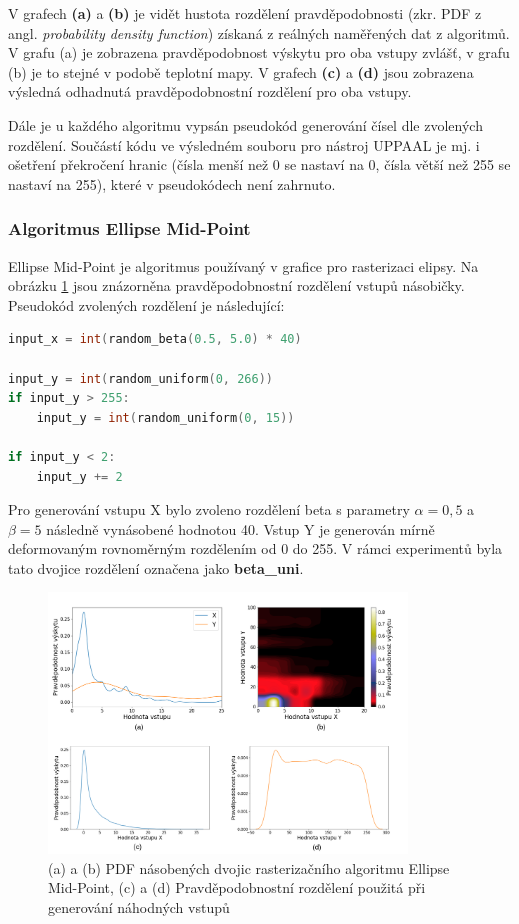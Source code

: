 V grafech \textbf{(a)} a \textbf{(b)} je vidět hustota rozdělení pravděpodobnosti (zkr. PDF z angl. \textit{probability density function}) získaná z reálných naměřených dat z algoritmů. V grafu (a) je zobrazena pravděpodobnost výskytu pro oba vstupy zvlášť, v grafu (b) je to stejné v podobě teplotní mapy. V grafech \textbf{(c)} a \textbf{(d)} jsou zobrazena výsledná odhadnutá pravděpodobnostní rozdělení pro oba vstupy.

Dále je u každého algoritmu vypsán pseudokód generování čísel dle zvolených rozdělení. Součástí kódu ve výsledném souboru pro nástroj UPPAAL je mj. i ošetření překročení hranic (čísla menší než 0 se nastaví na 0, čísla větší než 255 se nastaví na 255), které v pseudokódech není zahrnuto.

\pagebreak

\subsubsection{Algoritmus Ellipse Mid-Point}
Ellipse Mid-Point je algoritmus používaný v grafice pro rasterizaci elipsy. Na obrázku \ref{fig:beta_uni} jsou znázorněna pravděpodobnostní rozdělení vstupů násobičky. Pseudokód zvolených rozdělení je následující:

\begin{lstlisting}[language={C}, label={lst:ellipse}]
input_x = int(random_beta(0.5, 5.0) * 40)

input_y = int(random_uniform(0, 266))
if input_y > 255:
    input_y = int(random_uniform(0, 15))

if input_y < 2:
    input_y += 2
\end{lstlisting}

Pro generování vstupu X bylo zvoleno rozdělení beta s parametry $\alpha = 0,5$ a $\beta = 5$ následně vynásobené hodnotou 40. Vstup Y je generován mírně deformovaným rovnoměrným rozdělením od 0 do 255. V rámci experimentů byla tato dvojice rozdělení označena jako \textbf{beta\_uni}.

\begin{figure}[H]
    \centering
    \includegraphics[width=0.85\textwidth]{obrazky-figures/beta_uni_all.png}
    \caption{(a) a (b) PDF násobených dvojic rasterizačního algoritmu Ellipse Mid-Point, (c) a (d) Pravděpodobnostní rozdělení použitá při generování náhodných vstupů}
    \label{fig:beta_uni}
\end{figure}

